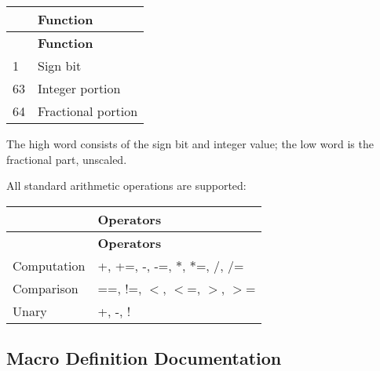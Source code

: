 \tabulinesep=1mm
\begin{longtabu} spread 0pt [c]{*2{|X[-1]}|}
\hline
{}&{\bf Function  }\\
\endfirsthead
\hline
\endfoot
\hline
{}&{\bf Function  }\\
 &Sign bit \\
63 &Integer portion \\
64 &Fractional portion \\
\end{longtabu}
The {\ttfamily high} word consists of the sign bit and integer value; the {\ttfamily low} word is the fractional part, unscaled.

All standard arithmetic operations are supported\+:

\tabulinesep=1mm
\begin{longtabu} spread 0pt [c]{*2{|X[-1]}|}
\hline
{}&{\bf Operators  }\\
\endfirsthead
\hline
\endfoot
\hline
{}&{\bf Operators  }\\
\endhead
Computation &{\ttfamily +}, {\ttfamily +=}, {\ttfamily -\/}, {\ttfamily -\/=}, {\ttfamily $\ast$}, {\ttfamily $\ast$=}, {\ttfamily /}, {\ttfamily /=} \\
Comparison &{\ttfamily ==}, {\ttfamily !=}, {\ttfamily $<$}, {\ttfamily $<$=}, {\ttfamily $>$}, {\ttfamily $>$=} \\
Unary &{\ttfamily +}, {\ttfamily -\/}, {\ttfamily !} \\
\end{longtabu}


\subsection{Macro Definition Documentation}
